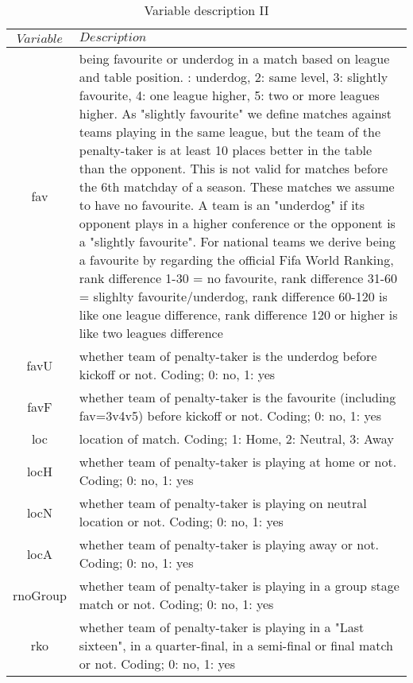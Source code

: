 \documentclass[12pt,dvipsnames]{article}%
\begin{document}
\begin{table}[h]
\caption{Variable description \small{II}}
\centering
\begin{tabular}{ c | p{12cm}  }
    $Variable$ & $Description$   \\
   \hline

fav & being favourite or underdog in a match based on league and table position. \newline 1: underdog, 2: same level, 3: slightly favourite, 4: one league higher, 5: two or more leagues higher. As "slightly favourite" we define matches against teams playing in the same league, but the team of the penalty-taker is at least 10 places better in the table than the opponent. This is not valid for matches before the 6th matchday of a season. These matches we assume to have no favourite. A team is an "underdog" if its opponent plays in a higher conference or the opponent is a "slightly favourite". For national teams we derive being a favourite by regarding the official Fifa World Ranking, rank difference 1-30 = no favourite, rank difference 31-60  = slighlty favourite/underdog,  rank difference 60-120 is like one league difference, rank difference 120 or higher is like two leagues difference \\

favU & whether team of penalty-taker is the underdog before kickoff or not. Coding; 0: no, 1: yes \\

favF & whether team of penalty-taker is the favourite (including fav=3v4v5) before kickoff or not. Coding; 0: no, 1: yes \\	

loc & location of match. Coding; 1: Home, 2: Neutral, 3: Away  \\

locH & whether team of penalty-taker is playing at home or not. Coding; 0: no, 1: yes \\

locN & whether team of penalty-taker is playing on neutral location or not. Coding; 0: no, 1: yes \\

locA & whether team of penalty-taker is playing away or not. Coding; 0: no, 1: yes \\

rnoGroup & whether team of penalty-taker is playing in a group stage match or not. Coding; 0: no, 1: yes \\

rko & whether team of penalty-taker is playing in a "Last sixteen", in a quarter-final, in a semi-final or final match or not. Coding; 0: no, 1: yes \\


\end{tabular}
\end{table}
\end{document}
